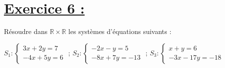 \documentclass[12pt,a4paper]{article}
\begin{document}
\section*{\underline{Exercice 6 :}}

 Résoudre dans \( \mathbb{R} \times \mathbb{R} \) les systèmes d’équations suivants :
    
        \( S_1: 
        \begin{cases} 
            3x + 2y = 7 \\
            -4x + 5y = 6
        \end{cases} \)
        \quad ; \quad
        \( S_2: 
        \begin{cases} 
            -2x - y = 5 \\
            -8x + 7y = -13
        \end{cases} \)
        \quad ; \quad
        \( S_3: 
        \begin{cases} 
            x + y = 6 \\
            -3x - 17y = -18
        \end{cases} \)
\end{document}
